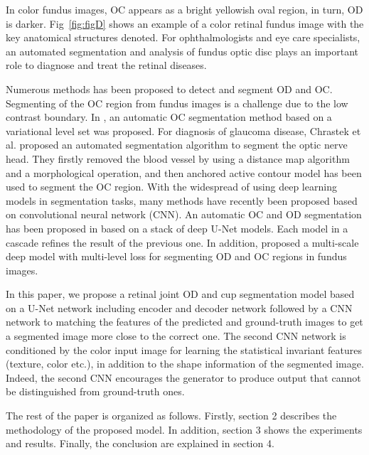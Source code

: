 \documentclass[runningheads,a4paper]{llncs}
\begin{document}
In color fundus images, OC appears as a bright yellowish oval region, in turn, OD is darker. Fig~\ref{fig:figD} shows an example of a color retinal fundus image with the key anatomical structures denoted. For ophthalmologists and eye care specialists, an automated segmentation and analysis of fundus optic disc plays an important role to diagnose and treat the retinal diseases. 


Numerous methods has been proposed to detect and segment OD and OC. Segmenting of the OC region from fundus images is a challenge due to the low contrast boundary.
In \cite{wong2008level}, an automatic OC segmentation method based on a variational level set was proposed. For diagnosis of glaucoma disease, Chrastek et al.\cite{chrastek2005automated} proposed an automated segmentation algorithm to segment the optic nerve head. They firstly removed the blood vessel by using a distance map algorithm and a morphological operation, and then anchored active contour model has been used to segment the OC region.
With the widespread of using deep learning models in segmentation tasks, many methods have recently been proposed based on convolutional neural network (CNN). An automatic OC and OD segmentation has been proposed in \cite{al2018multiscale} based on a stack of deep U-Net models. Each model in a cascade refines the result of the previous one. In addition, \cite{fu2018joint} proposed a multi-scale deep model with multi-level loss for segmenting OD and OC regions in fundus images. 

In this paper, we propose a retinal joint OD and cup segmentation model based on a U-Net network including encoder and decoder network followed by a CNN network to matching the features of the predicted and ground-truth images to get a segmented image more close to the correct one. The second CNN network is conditioned by the color input image for learning the statistical invariant features (texture, color etc.), in addition to the shape information of the segmented image. Indeed, the second CNN encourages the generator to produce output that cannot be distinguished from ground-truth ones.

The rest of the paper is organized as follows. Firstly, section 2 describes the methodology of the proposed model. In addition, section 3 shows the experiments and results. Finally, the conclusion are explained in section 4.
\end{document}
